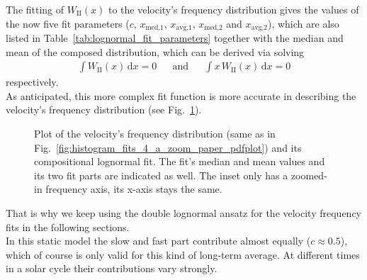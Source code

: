 The fitting of $W_\text{II}(x)$ to the velocity's frequency distribution gives the values of the now five fit parameters ($c$, $x_\text{med,1}$, $x_\text{avg,1}$, $x_\text{med,2}$ and $x_\text{avg,2}$), which are also listed in Table~\ref{tab:lognormal_fit_parameters} together with the median and mean of the composed distribution, which can be derived via solving
\begin{align}
	\int W_\text{II}(x)\,\text{d}x = 0	&	&\text{and}	&	&\int x\,W_\text{II}(x)\,\text{d}x = 0
\end{align}
respectively.\\
As anticipated, this more complex fit function is more accurate in describing the velocity's frequency distribution (see Fig.~\ref{fig:histogram_fits_V_a_zoom_dbl_paper_pdfplot}).
\begin{figure}
	\caption{Plot of the velocity's frequency distribution (same as in Fig.~\ref{fig:histogram_fits_4_a_zoom_paper_pdfplot}) and its compositional lognormal fit. The fit's median and mean values and its two fit parts are indicated as well. The inset only has a zoomed-in frequency axis, its x-axis stays the same.}
	\label{fig:histogram_fits_V_a_zoom_dbl_paper_pdfplot}
\end{figure}
That is why we keep using the double lognormal ansatz for the velocity frequency fits in the following sections.\\
In this static model the slow and fast part contribute almost equally ($c \approx 0.5$), which of course is only valid for this kind of long-term average. At different times in a solar cycle their contributions vary strongly.

